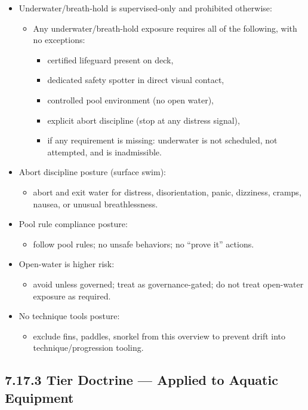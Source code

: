 \documentclass[10pt]{article}
\begin{document}
\begin{itemize}
\item Underwater/breath-hold is supervised-only and prohibited otherwise:
  \begin{itemize}
  \item Any underwater/breath-hold exposure requires all of the following, with no exceptions:
    \begin{itemize}
    \item certified lifeguard present on deck,
    \item dedicated safety spotter in direct visual contact,
    \item controlled pool environment (no open water),
    \item explicit abort discipline (stop at any distress signal),
    \item if any requirement is missing: underwater is not scheduled, not attempted, and is inadmissible.
    \end{itemize}
  \end{itemize}
\item Abort discipline posture (surface swim):
  \begin{itemize}
  \item abort and exit water for distress, disorientation, panic, dizziness, cramps, nausea, or unusual breathlessness.
  \end{itemize}
\item Pool rule compliance posture:
  \begin{itemize}
  \item follow pool rules; no unsafe behaviors; no “prove it” actions.
  \end{itemize}
\item Open-water is higher risk:
  \begin{itemize}
  \item avoid unless governed; treat as governance-gated; do not treat open-water exposure as required.
  \end{itemize}
\item No technique tools posture:
  \begin{itemize}
  \item exclude fins, paddles, snorkel from this overview to prevent drift into technique/progression tooling.
  \end{itemize}
\end{itemize}

\subsection*{7.17.3 Tier Doctrine — Applied to Aquatic Equipment}
{}
\end{document}

